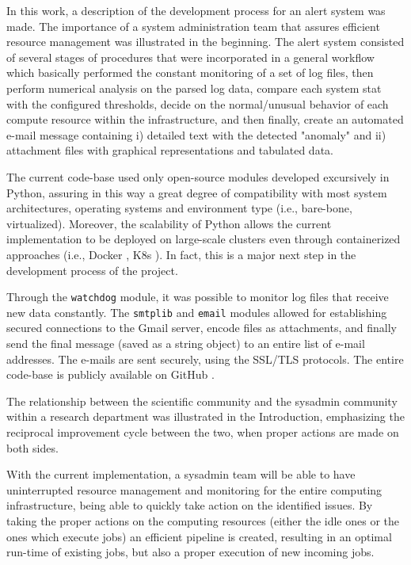 \documentclass[conference]{IEEEtran}
\begin{document}
In this work, a description of the development process for an alert system was made. The importance of a system administration team that assures efficient resource management was illustrated in the beginning. The alert system consisted of several stages of procedures that were incorporated in a general workflow which basically performed the constant monitoring of a set of log files, then perform numerical analysis on the parsed log data, compare each system stat with the configured thresholds, decide on the normal/unusual behavior of each compute resource within the infrastructure, and then finally, create an automated e-mail message containing i) detailed text with the detected "anomaly" and ii) attachment files with graphical representations and tabulated data.
\par The current code-base used only open-source modules developed excursively in Python, assuring in this way a great degree of compatibility with most system architectures, operating systems and environment type (i.e., bare-bone, virtualized). Moreover, the scalability of Python allows the current implementation to be deployed on large-scale clusters even through containerized approaches (i.e., Docker \cite{merkel2014docker}, K8s \cite{brewer2015kubernetes}). In fact, this is a major next step in the development process of the project.
\par Through the \texttt{watchdog} module, it was possible to monitor log files that receive new data constantly. The \texttt{smtplib} and \texttt{email} modules allowed for establishing secured connections to the Gmail server, encode files as attachments, and finally send the final message (saved as a string object) to an entire list of e-mail addresses. The e-mails are sent securely, using the SSL/TLS protocols. The entire code-base is publicly available on GitHub \cite{github-codebase}.
\par The relationship between the scientific community and the sysadmin community within a research department was illustrated in the Introduction, emphasizing the reciprocal improvement cycle between the two, when proper actions are made on both sides.
\par With the current implementation, a sysadmin team will be able to have uninterrupted resource management and monitoring for the entire computing infrastructure, being able to quickly take action on the identified issues. By taking the proper actions on the computing resources (either the idle ones or the ones which execute jobs) an efficient pipeline is created, resulting in an optimal run-time of existing jobs, but also a proper execution of new incoming jobs.
\end{document}
